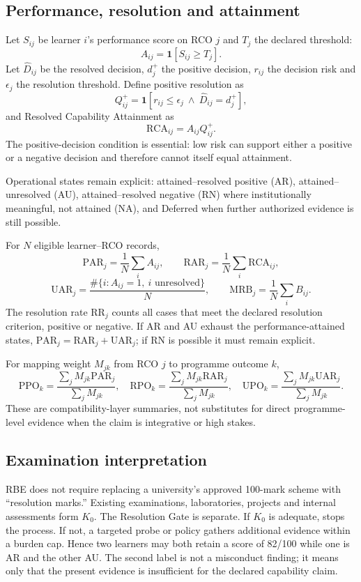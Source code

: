 \documentclass[11pt]{article}
\begin{document}
\subsection{Performance, resolution and attainment}
Let $S_{ij}$ be learner $i$'s performance score on RCO $j$ and $T_j$ the declared threshold:
\[
A_{ij}=\mathbf 1[S_{ij}\ge T_j].
\]
Let $\widehat D_{ij}$ be the resolved decision, $d_j^+$ the positive decision, $r_{ij}$ the decision risk and $\epsilon_j$ the resolution threshold. Define positive resolution as
\[
Q^+_{ij}=\mathbf 1[r_{ij}\le\epsilon_j\ \land\ \widehat D_{ij}=d_j^+],
\]
and Resolved Capability Attainment as
\[
\mathrm{RCA}_{ij}=A_{ij}Q^+_{ij}.
\]
The positive-decision condition is essential: low risk can support either a positive or a negative decision and therefore cannot itself equal attainment.

Operational states remain explicit: attained--resolved positive (AR), attained--unresolved (AU), attained--resolved negative (RN) where institutionally meaningful, not attained (NA), and Deferred when further authorized evidence is still possible.

For $N$ eligible learner--RCO records,
\[
\mathrm{PAR}_j=\frac{1}{N}\sum_i A_{ij},\qquad
\mathrm{RAR}_j=\frac{1}{N}\sum_i\mathrm{RCA}_{ij},
\]
\[
\mathrm{UAR}_j=\frac{\#\{i:A_{ij}=1,\ i\text{ unresolved}\}}{N},\qquad
\mathrm{MRB}_j=\frac{1}{N}\sum_iB_{ij}.
\]
The resolution rate $\mathrm{RR}_j$ counts all cases that meet the declared resolution criterion, positive or negative. If AR and AU exhaust the performance-attained states, $\mathrm{PAR}_j=\mathrm{RAR}_j+\mathrm{UAR}_j$; if RN is possible it must remain explicit.

For mapping weight $M_{jk}$ from RCO $j$ to programme outcome $k$,
\[
\mathrm{PPO}_k=\frac{\sum_jM_{jk}\mathrm{PAR}_j}{\sum_jM_{jk}},\quad
\mathrm{RPO}_k=\frac{\sum_jM_{jk}\mathrm{RAR}_j}{\sum_jM_{jk}},\quad
\mathrm{UPO}_k=\frac{\sum_jM_{jk}\mathrm{UAR}_j}{\sum_jM_{jk}}.
\]
These are compatibility-layer summaries, not substitutes for direct programme-level evidence when the claim is integrative or high stakes.

\subsection{Examination interpretation}
RBE does not require replacing a university's approved 100-mark scheme with ``resolution marks.'' Existing examinations, laboratories, projects and internal assessments form $K_0$. The Resolution Gate is separate. If $K_0$ is adequate,  stops the process. If not, a targeted probe or policy gathers additional evidence within a burden cap. Hence two learners may both retain a score of 82/100 while one is AR and the other AU. The second label is not a misconduct finding; it means only that the present evidence is insufficient for the declared capability claim.
\end{document}
